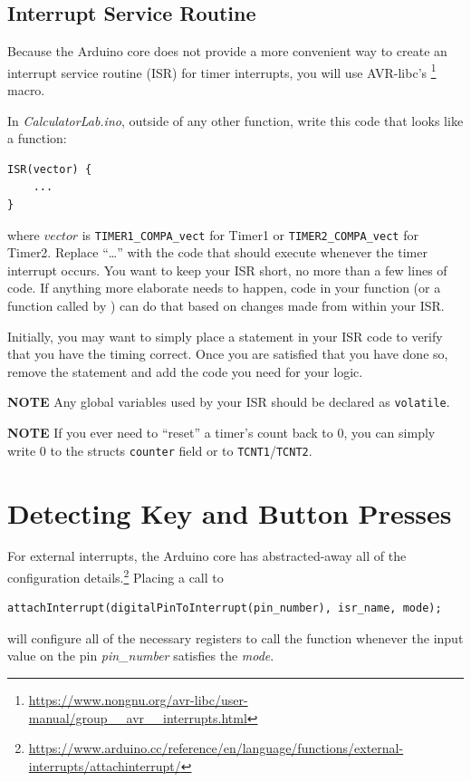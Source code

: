\subsection{Interrupt Service Routine}

Because the Arduino core does not provide a more convenient way to create an
interrupt service routine (ISR) for timer interrupts, you will use AVR-libc's
\footnote{\url{https://www.nongnu.org/avr-libc/user-manual/group__avr__interrupts.html}}
macro.

In \textit{CalculatorLab.ino}, outside of any other function, write this code that looks like a function:

\begin{lstlisting}
ISR(vector) {
    ...
}
\end{lstlisting}

where $vector$ is \lstinline{TIMER1_COMPA_vect} for Timer1 or
\lstinline{TIMER2_COMPA_vect} for Timer2. Replace ``\dots'' with the code that
should execute whenever the timer interrupt occurs. You want to keep your ISR
short, no more than a few lines of code. If anything more elaborate needs to
happen, code in your  function (or a function called by
) can do that based on changes made from within your ISR.

Initially, you may want to simply place a  statement in your
ISR code to verify that you have the timing correct. Once you are satisfied
that you have done so, remove the  statement and add the code
you need for your logic.

\textbf{NOTE} Any global variables used by your ISR should be declared as \lstinline{volatile}.

\textbf{NOTE} If you ever need to ``reset'' a timer's count back to 0, you can
simply write 0 to the structs \lstinline{counter} field or to
\texttt{TCNT1}/\texttt{TCNT2}.

\section{Detecting Key and Button Presses}\label{sec:ExternalInterrupts}

For external interrupts, the Arduino core has abstracted-away all of the
configuration details.\footnote{\url{https://www.arduino.cc/reference/en/language/functions/external-interrupts/attachinterrupt/}}
Placing a call to
\begin{lstlisting}
attachInterrupt(digitalPinToInterrupt(pin_number), isr_name, mode);
\end{lstlisting}
will configure all of the necessary registers to call the function
 whenever the input value on the pin \textit{pin\_number}
satisfies the \textit{mode}.

